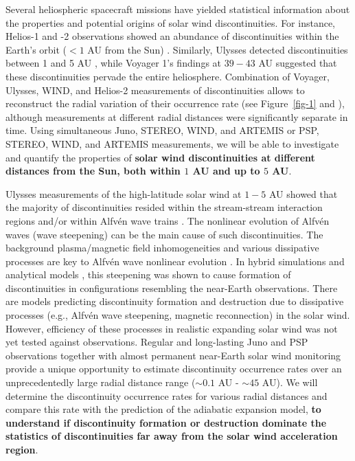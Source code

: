 \documentclass[
  letterpaper,
  DIV=11,
  numbers=noendperiod]{scrartcl}
\begin{document}
Several heliospheric spacecraft missions have yielded statistical
information about the properties and potential origins of solar wind
discontinuities. For instance, Helios-1 and -2 observations showed an
abundance of discontinuities within the Earth's orbit (\(<1\) AU from
the Sun) \citep{Mariani83}. Similarly, Ulysses detected discontinuities
between 1 and 5 AU \citep{tsurutaniNonlinearElectromagneticWaves1997},
while Voyager 1's findings at \(39-43\) AU \citep{Burlaga96,Burlaga11}
suggested that these discontinuities pervade the entire heliosphere.
Combination of Voyager, Ulysses, WIND, and Helios-2 measurements of
discontinuities allows to reconstruct the radial variation of their
occurrence rate (see Figure~\ref{fig-1} and
\citep{sodingRadialLatitudinalDependencies2001}), although measurements
at different radial distances were significantly separate in time. Using
simultaneous Juno, STEREO, WIND, and ARTEMIS or PSP, STEREO, WIND, and
ARTEMIS measurements, we will be able to investigate and quantify the
properties of \textbf{solar wind discontinuities at different distances
from the Sun, both within \(1\) AU and up to \(5\) AU}.

Ulysses measurements of the high-latitude solar wind at \(1-5\) AU
showed that the majority of discontinuities resided within the
stream-stream interaction regions and/or within Alfvén wave trains
\citep{tsurutaniInterplanetaryDiscontinuitiesAlfven1995, tsurutaniReviewDiscontinuitiesAlfven1999}.
The nonlinear evolution of Alfvén waves (wave steepening) can be the
main cause of such discontinuities. The background plasma/magnetic field
inhomogeneities and various dissipative processes are key to Alfvén wave
nonlinear evolution
\citep{Lerche75, Prakash&Diamond99, Medvedev97:prl, Nariyuki14, Yang15}.
In hybrid simulations
\citep[see][]{Vasquez&Hollweg98, Vasquez&Hollweg01, TenBarge&Howes13}
and analytical models
\citep[e.g.,][]{Kennel88:jetp, Hada89, Malkov91, Wu&Kennel92, Medvedev97:pop},
this steepening was shown to cause formation of discontinuities in
configurations resembling the near-Earth observations. There are models
predicting discontinuity formation
\citep{Servidio15, Podesta&Roytershteyn17} and destruction
\citep{Servidio11,Matthaeus15} due to dissipative processes (e.g.,
Alfvén wave steepening, magnetic reconnection) in the solar wind.
However, efficiency of these processes in realistic expanding solar wind
was not yet tested against observations. Regular and long-lasting Juno
and PSP observations together with almost permanent near-Earth solar
wind monitoring provide a unique opportunity to estimate discontinuity
occurrence rates over an unprecedentedly large radial distance range
(\(\sim 0.1\) AU - \(\sim 45\) AU). We will determine the discontinuity
occurrence rates for various radial distances and compare this rate with
the prediction of the adiabatic expansion model, \textbf{to understand
if discontinuity formation or destruction dominate the statistics of
discontinuities far away from the solar wind acceleration region}.
\end{document}
